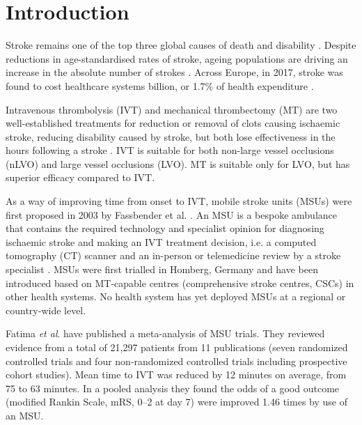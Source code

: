 \section{Introduction}


Stroke remains one of the top three global causes of death and disability \cite{feigin_global_2021}. Despite reductions in age-standardised rates of stroke, ageing populations are driving an increase in the absolute number of strokes \cite{feigin_global_2021}. Across Europe, in 2017, stroke was found to cost healthcare systems  billion, or 1.7\% of health expenditure \cite{luengo-fernandez_economic_2020}.

Intravenous thrombolysis (IVT) and mechanical thrombectomy (MT) are two well-established treatments for reduction or removal of clots causing ischaemic stroke, reducing disability caused by stroke, but both lose effectiveness in the hours following a stroke \cite{emberson_effect_2014, fransen_time_2016}. IVT is suitable for both non-large vessel occlusions (nLVO) and large vessel occlusions (LVO). MT is suitable only for LVO, but has superior efficacy compared to IVT.


As a way of improving time from onset to IVT, mobile stroke units (MSUs) were first proposed in 2003 by Fassbender et al. \cite{fassbender_mobile_2003}. An MSU is a bespoke ambulance that contains the required technology and specialist opinion for diagnosing ischaemic stroke and making an IVT treatment decision, i.e. a computed tomography (CT) scanner and an in-person or telemedicine review by a stroke specialist \cite{taqui_reduction_2017}. MSUs were first trialled in Homberg, Germany \cite{walter_diagnosis_2012} and have been introduced based on MT-capable centres (comprehensive stroke centres, CSCs) in other health systems. No health system has yet deployed MSUs at a regional or country-wide level.

Fatima \textit{et al}. \cite{fatima_mobile_2020} have published a meta-analysis of MSU trials. They reviewed evidence from a total of 21,297 patients from 11 publications (seven randomized controlled trials and four non-randomized controlled trials including prospective cohort studies). Mean time to IVT was reduced by 12 minutes on average, from 75 to 63 minutes. In a pooled analysis they found the odds of a good outcome (modified Rankin Scale, mRS, 0--2 at day 7) were improved 1.46 times by use of an MSU.

